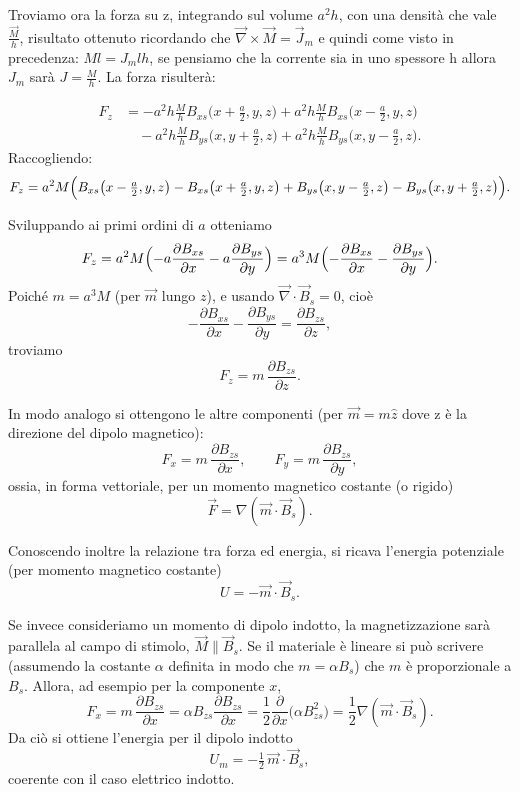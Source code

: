 \documentclass{book}
\begin{document}
Troviamo ora la forza su z, integrando sul volume $a^2h$, con una densità che vale $\frac{\vec{M}}{h}$, risultato ottenuto ricordando che $\vec{\nabla}\times\vec{M}= \vec{J}_m$ e quindi come visto in precedenza: $Ml=J_mlh$, se pensiamo che la corrente sia in uno spessore h allora $J_m$ sarà $J=\frac{M}{h}$.
La forza risulterà:

\begin{align*}
F_z &= -a^2h\frac{M}{h}B_{xs}\bigl(x+\tfrac{a}{2},y,z\bigr) + a^2h\frac{M}{h}B_{xs}\bigl(x-\tfrac{a}{2},y,z\bigr) \\
&\quad - a^2h\frac{M}{h}B_{ys}\bigl(x,y+\tfrac{a}{2},z\bigr) + a^2h\frac{M}{h}B_{ys}\bigl(x,y-\tfrac{a}{2},z\bigr).
\end{align*}
Raccogliendo:
$$
F_z = a^2 M\Bigl(B_{xs}\bigl(x-\tfrac{a}{2},y,z\bigr)-B_{xs}\bigl(x+\tfrac{a}{2},y,z\bigr) + B_{ys}\bigl(x,y-\tfrac{a}{2},z\bigr)-B_{ys}\bigl(x,y+\tfrac{a}{2},z\bigr)\Bigr).
$$

Sviluppando ai primi ordini di \(a\) otteniamo
$$
F_z = a^2 M\Bigl(-a\frac{\partial B_{xs}}{\partial x} - a\frac{\partial B_{ys}}{\partial y}\Bigr)
= a^3 M\Bigl(-\frac{\partial B_{xs}}{\partial x} - \frac{\partial B_{ys}}{\partial y}\Bigr).
$$
Poiché \(m=a^3 M\) (per \(\vec{m}\) lungo \(z\)), e usando \(\vec{\nabla}\cdot\vec{B}_s=0\), cioè
$$
-\frac{\partial B_{xs}}{\partial x} - \frac{\partial B_{ys}}{\partial y} = \frac{\partial B_{zs}}{\partial z},
$$
troviamo
$$
F_z = m\,\frac{\partial B_{zs}}{\partial z}.
$$

In modo analogo si ottengono le altre componenti (per \(\vec{m}=m\hat z\) dove z è la direzione del dipolo magnetico):
$$
F_x = m\,\frac{\partial B_{zs}}{\partial x},\qquad
F_y = m\,\frac{\partial B_{zs}}{\partial y},
$$
ossia, in forma vettoriale, per un momento magnetico costante (o rigido)
$$
\vec{F} = \nabla(\vec{m}\cdot\vec{B}_s).
$$

Conoscendo inoltre la relazione tra forza ed energia, si ricava l'energia potenziale (per momento magnetico costante)
$$
U = -\vec{m}\cdot\vec{B}_s.
$$

\medskip

Se invece consideriamo un momento di dipolo indotto, la magnetizzazione sarà parallela al campo di stimolo, \(\vec{M}\parallel\vec{B}_s\). Se il materiale è lineare si può scrivere (assumendo la costante \(\alpha\) definita in modo che \(m=\alpha B_{s}\)) che \(m\) è proporzionale a \(B_s\). Allora, ad esempio per la componente \(x\),
$$
F_x = m\,\frac{\partial B_{zs}}{\partial x} = \alpha B_{zs}\frac{\partial B_{zs}}{\partial x}
= \frac{1}{2}\frac{\partial}{\partial x}\bigl(\alpha B_{zs}^2\bigr)
= \frac{1}{2}\nabla(\vec{m}\cdot\vec{B}_s).
$$
Da ciò si ottiene l'energia per il dipolo indotto
$$
U_m = -\tfrac{1}{2}\,\vec{m}\cdot\vec{B}_s,
$$
coerente con il caso elettrico indotto.
\end{document}
